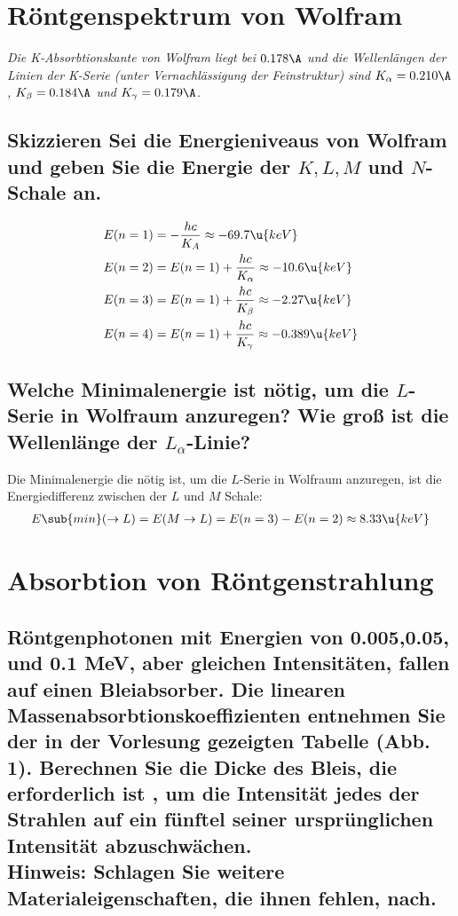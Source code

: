 \documentclass[ex, minted]{exercise_4.1}
\begin{document}
\section{Röntgenspektrum von Wolfram}
{\it Die K-Absorbtionskante von Wolfram liegt bei $0.178\A$ und die Wellenlängen der Linien der K-Serie (unter Vernachlässigung der Feinstruktur) sind \(K_\alpha=0.210\A\), \(K_\beta=0.184\A\) und \(K_\gamma=0.179\A\).}
\subsection{Skizzieren Sei die Energieniveaus von Wolfram und geben Sie die Energie der $K,L,M$ und $N$-Schale an.}

\dottedlinete


\begin{align*}
    E(n=1) &= - \frac{h c}{K_A} \approx -69.7 \u{keV}\\
    E(n=2) &= E(n=1) + \frac{h c}{K_\alpha} \approx   -10.6 \u{keV}\\
    E(n=3) &= E(n=1) + \frac{h c}{K_\beta} \approx  -2.27 \u{keV}\\
    E(n=4) &= E(n=1) + \frac{h c}{K_\gamma} \approx  -0.389 \u{keV}\\
\end{align*}

\subsection{Welche Minimalenergie ist nötig, um die \(L\)-Serie in Wolfraum anzuregen? Wie groß ist die Wellenlänge der \(L_\alpha\)-Linie?}

\dottedlinett

Die Minimalenergie die nötig ist, um die \(L\)-Serie in Wolfraum anzuregen, ist die Energiedifferenz zwischen der $L$ und $M$ Schale:
\begin{align*}
    E\sub{min}(\to L ) = E(M\to L ) = E(n=3) - E(n=2)\approx 8.33\u{keV} 
\end{align*}


\section{Absorbtion von Röntgenstrahlung}
\subsection{Röntgenphotonen mit Energien von 0.005,0.05, und 0.1 MeV, aber gleichen Intensitäten, fallen auf einen Bleiabsorber. Die linearen Massenabsorbtionskoeffizienten entnehmen Sie der in der Vorlesung gezeigten Tabelle (Abb. 1). Berechnen Sie die Dicke des Bleis, die erforderlich ist , um die Intensität jedes der Strahlen auf ein fünftel seiner ursprünglichen Intensität abzuschwächen.\\
Hinweis: Schlagen Sie weitere Materialeigenschaften, die ihnen fehlen, nach. }
\end{document}
